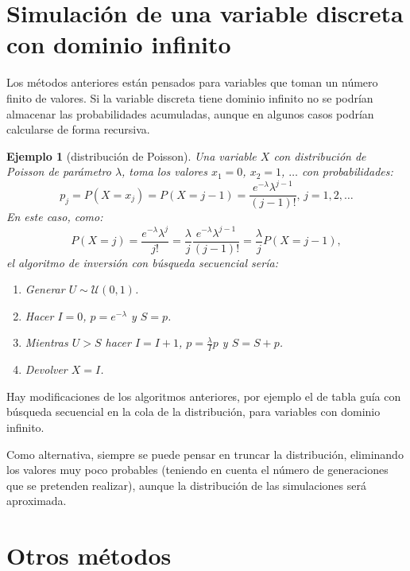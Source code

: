 \documentclass[
  spanish,
  10pt,
]{book}
\theoremstyle{break}
\newtheorem{example}{Ejemplo}[chapter]
\theoremstyle{nonumberplain}
\begin{document}
\section{Simulación de una variable discreta con dominio infinito}\label{simulaciuxf3n-de-una-variable-discreta-con-dominio-infinito}

Los métodos anteriores están pensados para variables que toman un número finito de valores.
Si la variable discreta tiene dominio infinito no se podrían almacenar las probabilidades acumuladas, aunque en algunos casos podrían calcularse de forma recursiva.

\begin{example}[distribución de Poisson]

Una variable \(X\) con distribución de Poisson de parámetro \(\lambda\),
toma los valores \(x_{1}=0\), \(x_{2}=1\), \(\ldots\) con probabilidades:
\[p_{j}=P\left( X=x_{j}\right)  =P\left( X=j-1\right)  =\frac{e^{-\lambda
}\lambda^{j-1}}{\left( j-1\right)  !}\text{, }j=1,2,\ldots\]
En este caso, como:
\[P\left( X=j\right)  =\frac{e^{-\lambda}\lambda^{j}}{j!}
=\frac{\lambda}{j}\frac{e^{-\lambda}\lambda^{j-1}}{\left( j-1\right)  !}
=\frac{\lambda}{j}P\left( X=j-1\right),\]
el algoritmo de inversión con búsqueda secuencial sería:

\begin{enumerate}
\def\labelenumi{\arabic{enumi}.}
\item
  Generar \(U\sim \mathcal{U}\left( 0,1\right)\).
\item
  Hacer \(I=0\), \(p=e^{-\lambda}\) y \(S=p\).
\item
  Mientras \(U>S\) hacer \(I=I+1\), \(p=\frac{\lambda}{I}p\) y \(S=S+p\).
\item
  Devolver \(X=I\).
\end{enumerate}

\end{example}

Hay modificaciones de los algoritmos anteriores, por ejemplo el de tabla guía con búsqueda secuencial en la cola de la distribución, para variables con dominio infinito.

Como alternativa, siempre se puede pensar en truncar la distribución,
eliminando los valores muy poco probables (teniendo en cuenta el número de generaciones que se pretenden realizar),
aunque la distribución de las simulaciones será aproximada.

\section{Otros métodos}\label{otros-muxe9todos}
\end{document}
